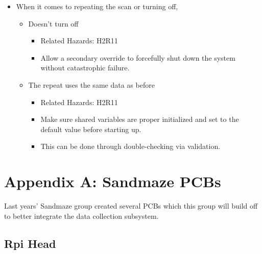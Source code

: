 \documentclass[11pt]{article}
\begin{document}
\begin{itemize}
\begin{itemize}
\begin{itemize}
					\end{itemize}
			\end{itemize}
			\item When it comes to repeating the scan or turning off, 
			\begin{itemize}
				\item Doesn’t turn off
					\begin{itemize}
						\item Related Hazards: H2R11 
						\item Allow a secondary override to forcefully shut down the system without catastrophic failure. 
					\end{itemize}
				\item The repeat uses the same data as before
					\begin{itemize}
						\item Related Hazards: H2R11 
						\item Make sure shared variables are proper initialized and set to the default value before starting up. 
						\item This can be done through double-checking via validation.  
					\end{itemize}
			\end{itemize}
		\end{itemize}
	\newpage
	\section{Appendix A: Sandmaze PCBs}
		Last years’ Sandmaze group created several PCBs which this group will build off to better integrate the data collection subsystem. 

		\subsection{Rpi Head} 
\end{document}
